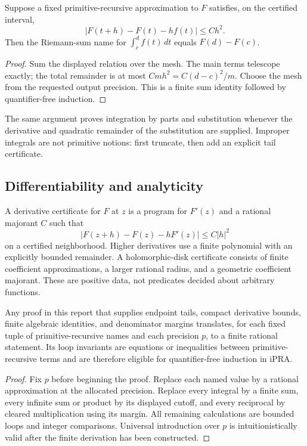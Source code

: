 \begin{lemma}
Suppose a fixed primitive-recursive approximation to $F$ satisfies, on the certified interval,
\[
 |F(t+h)-F(t)-hf(t)|\le C h^2.
\]
Then the Riemann-sum name for $\int_c^d f(t)\,dt$ equals $F(d)-F(c)$.
\end{lemma}

\begin{proof}
Sum the displayed relation over the mesh.  The main terms telescope exactly; the total remainder is at most $Cm h^2=C(d-c)^2/m$.  Choose the mesh from the requested output precision.  This is a finite sum identity followed by quantifier-free induction.
\end{proof}

The same argument proves integration by parts and substitution whenever the derivative and quadratic remainder of the substitution are supplied.  Improper integrals are not primitive notions: first truncate, then add an explicit tail certificate.

\subsection{Differentiability and analyticity}

A derivative certificate for $F$ at $z$ is a program for $F'(z)$ and a rational majorant $C$ such that
\[
 |F(z+h)-F(z)-hF'(z)|\le C|h|^2
\]
on a certified neighborhood.  Higher derivatives use a finite polynomial with an explicitly bounded remainder.  A holomorphic-disk certificate consists of finite coefficient approximations, a larger rational radius, and a geometric coefficient majorant.  These are positive data, not predicates decided about arbitrary functions.

\begin{proposition}
Any proof in this report that supplies endpoint tails, compact derivative bounds, finite algebraic identities, and denominator margins translates, for each fixed tuple of primitive-recursive names and each precision $p$, to a finite rational statement.  Its loop invariants are equations or inequalities between primitive-recursive terms and are therefore eligible for quantifier-free induction in iPRA.
\end{proposition}

\begin{proof}
Fix $p$ before beginning the proof.  Replace each named value by a rational approximation at the allocated precision.  Replace every integral by a finite sum, every infinite sum or product by its displayed cutoff, and every reciprocal by cleared multiplication using its margin.  All remaining calculations are bounded loops and integer comparisons.  Universal introduction over $p$ is intuitionistically valid after the finite derivation has been constructed.
\end{proof}
